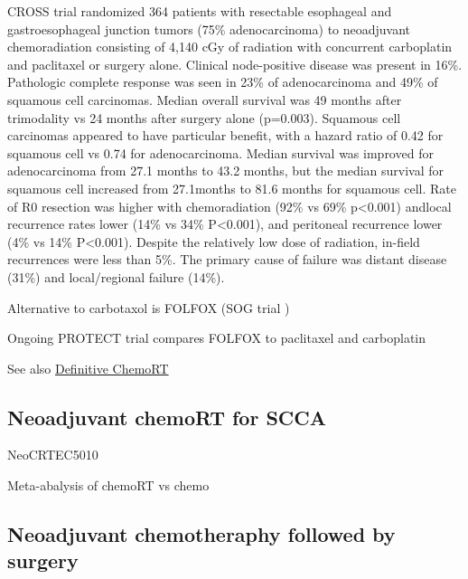 \documentclass[
]{book}
\begin{document}
CROSS trial randomized 364 patients with resectable esophageal and gastroesophageal junction tumors (75\% adenocarcinoma) to neoadjuvant chemoradiation consisting of 4,140 cGy of radiation with concurrent carboplatin and paclitaxel or surgery alone.\citep{vanhagen2074} Clinical node-positive disease was present in 16\%. Pathologic complete response was seen in 23\% of adenocarcinoma and 49\% of squamous cell carcinomas. Median overall survival was 49 months after trimodality vs 24 months after surgery alone (p=0.003). Squamous cell carcinomas appeared to have particular benefit, with a hazard ratio of 0.42 for squamous cell vs 0.74 for adenocarcinoma. Median survival was improved for adenocarcinoma from 27.1 months to 43.2 months, but the median survival for squamous cell increased from 27.1months to 81.6 months for squamous cell. Rate of R0 resection was higher with chemoradiation (92\% vs 69\% p\textless0.001) andlocal recurrence rates lower (14\% vs 34\% P\textless0.001), and peritoneal recurrence lower (4\% vs 14\% P\textless0.001). Despite the relatively low dose of radiation, in-field recurrences were less than 5\%. The primary cause of failure was distant disease (31\%) and local/regional failure (14\%).\citep{oppedijk385}

Alternative to carbotaxol is FOLFOX (SOG trial \citep{leichman4555})

Ongoing PROTECT trial compares FOLFOX to paclitaxel and carboplatin \citep{messager318}

See also \protect\hyperlink{eso_dcrt}{Definitive ChemoRT}

\hypertarget{neoadjuvant-chemort-for-scca}{%
\subsection{Neoadjuvant chemoRT for SCCA}\label{neoadjuvant-chemort-for-scca}}

NeoCRTEC5010 \citep{yang2796}

Meta-abalysis of chemoRT vs chemo \citep{zhaoe0202185}

\hypertarget{neoadjuvant-chemotheraphy-followed-by-surgery}{%
\subsection{Neoadjuvant chemotheraphy followed by surgery}\label{neoadjuvant-chemotheraphy-followed-by-surgery}}
\end{document}
